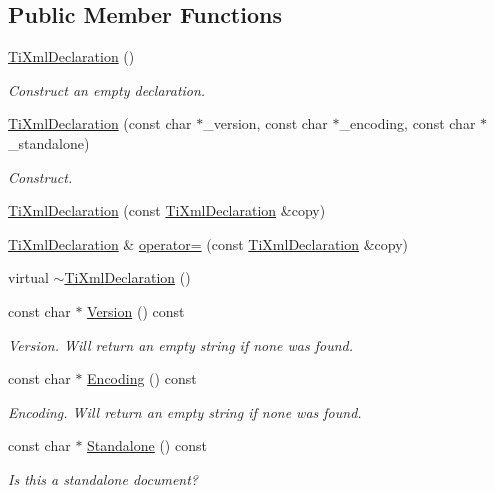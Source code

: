 \subsection*{Public Member Functions}
\begin{DoxyCompactItemize}
\item 
\hyperlink{class_ti_xml_declaration_aa0484d059bea0ea1acb47c9094382d79}{TiXmlDeclaration} ()
\begin{DoxyCompactList}\small\item\em Construct an empty declaration. \end{DoxyCompactList}\item 
\hyperlink{class_ti_xml_declaration_a3b618d1c30c25e4b7a71f31a595ee298}{TiXmlDeclaration} (const char $\ast$\_\-version, const char $\ast$\_\-encoding, const char $\ast$\_\-standalone)
\begin{DoxyCompactList}\small\item\em Construct. \end{DoxyCompactList}\item 
\hyperlink{class_ti_xml_declaration_a58ac9042c342f7845c8491da0bb091e8}{TiXmlDeclaration} (const \hyperlink{class_ti_xml_declaration}{TiXmlDeclaration} \&copy)
\item 
\hyperlink{class_ti_xml_declaration}{TiXmlDeclaration} \& \hyperlink{class_ti_xml_declaration_a3bc617efe11014ff2b1a9c5727c37a9a}{operator=} (const \hyperlink{class_ti_xml_declaration}{TiXmlDeclaration} \&copy)
\item 
virtual \hyperlink{class_ti_xml_declaration_ad5f37a673f4c507fd7e550470f9cec25}{$\sim$TiXmlDeclaration} ()
\item 
const char $\ast$ \hyperlink{class_ti_xml_declaration_a02ee557b1a4545c3219ed377c103ec76}{Version} () const 
\begin{DoxyCompactList}\small\item\em Version. Will return an empty string if none was found. \end{DoxyCompactList}\item 
const char $\ast$ \hyperlink{class_ti_xml_declaration_a5d974231f9e9a2f0542f15f3a46cdb76}{Encoding} () const 
\begin{DoxyCompactList}\small\item\em Encoding. Will return an empty string if none was found. \end{DoxyCompactList}\item 
const char $\ast$ \hyperlink{class_ti_xml_declaration_a9ff06afc033d7ef730ec7c6825b97ad9}{Standalone} () const 
\begin{DoxyCompactList}\small\item\em Is this a standalone document? \end{DoxyCompactList}\item 

\end{DoxyCompactItemize}
